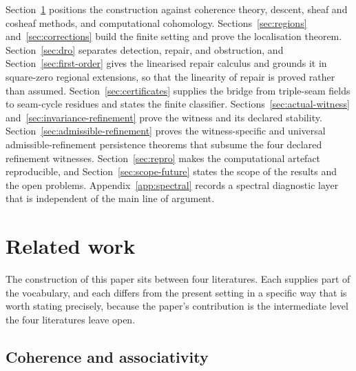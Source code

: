 \documentclass[11pt]{article}
\begin{document}
Section~\ref{sec:related} positions the construction against coherence theory, descent, sheaf and cosheaf methods, and computational cohomology. Sections~\ref{sec:regions} and~\ref{sec:corrections} build the finite setting and prove the localisation theorem. Section~\ref{sec:dro} separates detection, repair, and obstruction, and Section~\ref{sec:first-order} gives the linearised repair calculus and grounds it in square-zero regional extensions, so that the linearity of repair is proved rather than assumed. Section~\ref{sec:certificates} supplies the bridge from triple-seam fields to seam-cycle residues and states the finite classifier. Sections~\ref{sec:actual-witness} and~\ref{sec:invariance-refinement} prove the witness and its declared stability. Section~\ref{sec:admissible-refinement} proves the witness-specific and universal admissible-refinement persistence theorems that subsume the four declared refinement witnesses. Section~\ref{sec:repro} makes the computational artefact reproducible, and Section~\ref{sec:scope-future} states the scope of the results and the open problems. Appendix~\ref{app:spectral} records a spectral diagnostic layer that is independent of the main line of argument.

\section{Related work}
\label{sec:related}

The construction of this paper sits between four literatures. Each supplies part of the vocabulary, and each differs from the present setting in a specific way that is worth stating precisely, because the paper's contribution is the intermediate level the four literatures leave open.

\subsection{Coherence and associativity}
\end{document}
